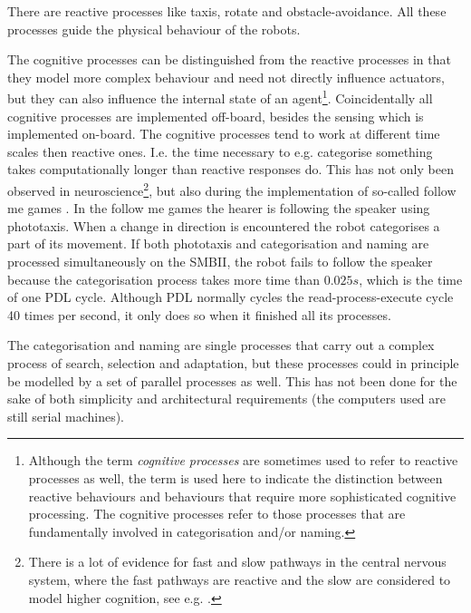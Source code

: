 There are reactive processes like taxis, rotate and obstacle-avoidance. All these processes guide the physical behaviour of the robots.


The cognitive processes can be distinguished from the reactive processes in that they model more complex behaviour and need not directly influence actuators, but they can also influence the internal state of an agent\footnote{Although the term {\em cognitive processes} are sometimes used to refer to reactive processes as well, the term is used here to indicate the distinction between reactive behaviours and behaviours that require more sophisticated cognitive processing. The cognitive processes refer to those processes that are fundamentally involved in categorisation and/or naming.}. Coincidentally all cognitive processes are implemented off-board, besides the sensing which is implemented on-board. The cognitive processes tend to work at different time scales then reactive ones. I.e. the time necessary to e.g. categorise something takes computationally longer than reactive responses do. This has not only been observed in neuroscience\footnote{There is a lot of evidence for fast and slow pathways in the central nervous system, where the fast pathways are reactive and the slow are considered to model higher cognition, see e.g. \citep{ledoux:1996}.}, but also during the implementation of so-called follow me games \citep{vogt:1999a,vogt:2000}.  In the follow me games the hearer is following the speaker using phototaxis. When a change in direction is encountered the robot categorises a part of its movement. If both phototaxis and categorisation and naming are processed simultaneously on the SMBII, the robot fails to follow the speaker because the categorisation process takes more time than $0.025 s$, which is the time of one PDL cycle. Although PDL normally cycles the read-process-execute cycle 40 times per second, it only does so when it finished all its processes. 

The categorisation and naming are single processes that carry out a complex process of search, selection and adaptation, but these processes could in principle be modelled by a set of parallel processes as well. This has not been done for the sake of both simplicity and architectural requirements (the computers used are still serial machines).


